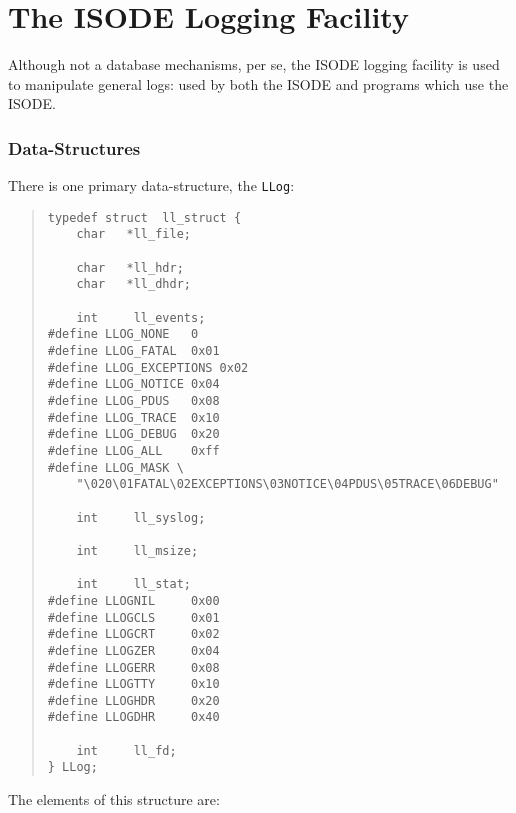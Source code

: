 
\chapter	{The ISODE Logging Facility}\label{logging}
Although not a database mechanisms, per se, the ISODE logging facility 
is used to manipulate general logs:
used by both the ISODE and programs which use the ISODE.

\subsection	{Data-Structures}
There is one primary data-structure, the \verb"LLog":
\begin{quote}\small\begin{verbatim}
typedef struct  ll_struct {
    char   *ll_file;

    char   *ll_hdr;
    char   *ll_dhdr;

    int	    ll_events;
#define	LLOG_NONE	0
#define	LLOG_FATAL	0x01
#define	LLOG_EXCEPTIONS	0x02
#define	LLOG_NOTICE	0x04
#define	LLOG_PDUS	0x08
#define	LLOG_TRACE	0x10
#define	LLOG_DEBUG	0x20
#define	LLOG_ALL	0xff
#define	LLOG_MASK \
    "\020\01FATAL\02EXCEPTIONS\03NOTICE\04PDUS\05TRACE\06DEBUG"

    int	    ll_syslog;

    int     ll_msize;

    int     ll_stat;
#define	LLOGNIL		0x00
#define	LLOGCLS		0x01
#define	LLOGCRT		0x02
#define	LLOGZER		0x04
#define	LLOGERR		0x08
#define	LLOGTTY		0x10
#define	LLOGHDR		0x20
#define	LLOGDHR		0x40

    int     ll_fd;
} LLog;
\end{verbatim}\end{quote}
The elements of this structure are:

